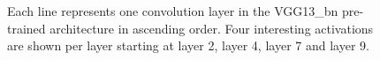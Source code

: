 \begin{figure}[!h]
\centering
\caption{Each line represents one convolution layer in the VGG13\_bn pre-trained architecture in ascending order. Four interesting activations are shown per layer starting at layer 2, layer 4, layer 7 and layer 9.}


\end{figure}
